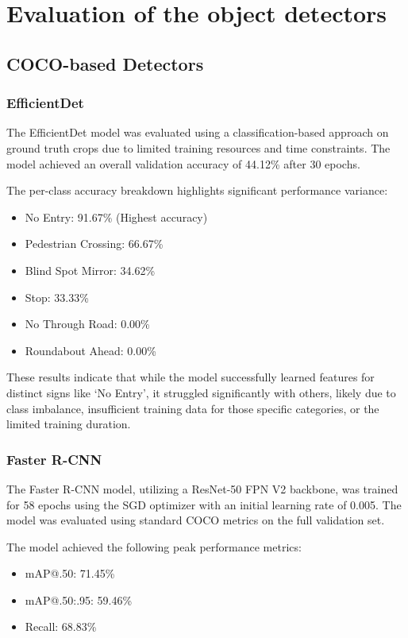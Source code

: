 \documentclass{article}
\begin{document}
\section{Evaluation of the object detectors}

\subsection{COCO-based Detectors}

\subsubsection{EfficientDet}
The EfficientDet model was evaluated using a classification-based approach on ground truth crops due to limited training resources and time constraints. The model achieved an overall validation accuracy of 44.12\% after 30 epochs.

The per-class accuracy breakdown highlights significant performance variance:
\begin{itemize}
    \item No Entry: 91.67\% (Highest accuracy)
    \item Pedestrian Crossing: 66.67\%
    \item Blind Spot Mirror: 34.62\%
    \item Stop: 33.33\%
    \item No Through Road: 0.00\%
    \item Roundabout Ahead: 0.00\%
\end{itemize}
These results indicate that while the model successfully learned features for distinct signs like `No Entry', it struggled significantly with others, likely due to class imbalance, insufficient training data for those specific categories, or the limited training duration.

\subsubsection{Faster R-CNN}
The Faster R-CNN model, utilizing a ResNet-50 FPN V2 backbone, was trained for 58 epochs using the SGD optimizer with an initial learning rate of 0.005. The model was evaluated using standard COCO metrics on the full validation set.

The model achieved the following peak performance metrics:
\begin{itemize}
    \item mAP@.50: 71.45\%
    \item mAP@.50:.95: 59.46\%
    \item Recall: 68.83\%
\end{itemize}
\end{document}
